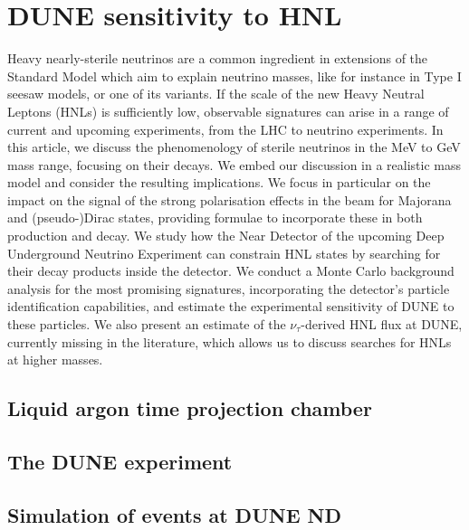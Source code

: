 \clearpage
\chapter{DUNE sensitivity to HNL}

Heavy nearly-sterile neutrinos are a common ingredient in extensions of the
Standard Model which aim to explain neutrino masses, like for instance in Type I
seesaw models, or one of its variants. If the scale of the new Heavy Neutral Leptons (HNLs) is sufficiently low, 
observable signatures can arise in a range of current and upcoming experiments, from the LHC to neutrino experiments.
%
In this article, we discuss the phenomenology of sterile neutrinos in the MeV to GeV mass range, focusing on their decays. We embed our discussion in a realistic mass model and consider the resulting implications.
%
We focus in particular on the impact on the signal of the strong polarisation
effects in the beam for Majorana and \mbox{(pseudo-)Dirac} states, providing formulae 
to incorporate these in both production and decay.
%
We study how the Near Detector of the upcoming Deep Underground Neutrino
Experiment can constrain HNL states by searching for their decay products inside the detector.
%
We conduct a Monte Carlo background analysis for the most promising
signatures, incorporating the detector's particle identification capabilities,
and estimate the experimental sensitivity of DUNE to these particles.  
%
We also present an estimate of the \mbox{$\nu_\tau$-derived} HNL flux at DUNE, 
currently missing in the literature, which allows us to discuss searches for 
HNLs at higher masses.  
%
 
\section{Liquid argon time projection chamber}

\section{The DUNE experiment}

\section{Simulation of events at DUNE ND}
\label{sec:experiment}

